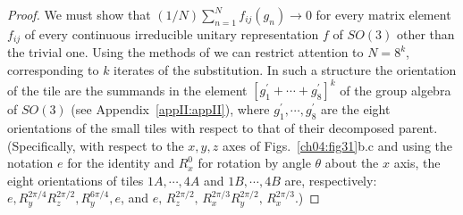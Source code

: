 \documentclass[reqno]{stml-l}
\theoremstyle{plain}
\theoremstyle{definition}
\numberwithin{equation}{chapter}
\begin{document}
\begin{proof}
We must show that
$(1/N)\sum\nolimits_{n=1}^{N}f_{ij}(g_{n})\rightarrow 0$
for every matrix element $f_{ij}$ of every continuous
irreducible unitary representation $f$ of $SO(3)$ other
than the trivial one. Using the methods of \cite{bib:Ra3} we can
restrict attention to $N=8^{k}$, corresponding to $k$
iterates of the substitution. In such a structure the
orientation of the tile are the summands in the element
$[g_{1}^{\prime}+\cdots+g_{8}^{\prime}]^{k}$ of the group
algebra of $SO(3)$ (see Appendix~\ref{appII:appII}), where
$g_{1}^{\prime},\cdots,g_{8}^{\prime}$ are the eight
orientations of the small tiles with respect to that of
their decomposed parent. (Specifically, with respect to the
$x,y,z$ axes of Figs.~\ref{ch04:fig31}b.c and using the
notation $e$ for the identity and $R^{0}_{x}$ for rotation
by angle $\theta$ about the $x$ axis, the eight
orientations of tiles $1A,\cdots,4A$ and $1B,\cdots,4B$
are, respectively:
$e,R_{y}^{2\pi/4}R_{z}^{2\pi/2},R_{y}^{6\pi/4},e$, and
$e,\,R_{z}^{2\pi/2},\,
R_{x}^{2\pi/3}R_{y}^{2\pi/2},\,R_{x}^{2\pi/3}$.)


\end{proof}
\end{document}
